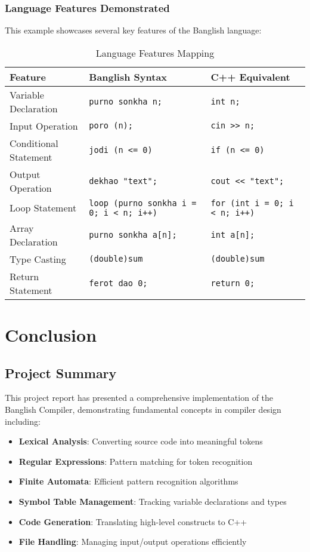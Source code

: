 \documentclass[12pt,a4paper]{article}
\begin{document}
\subsubsection{Language Features Demonstrated}

This example showcases several key features of the Banglish language:

\begin{table}[H]
\centering
\begin{tabular}{|l|l|l|}
\hline
\textbf{Feature} & \textbf{Banglish Syntax} & \textbf{C++ Equivalent} \\
\hline
Variable Declaration & \texttt{purno sonkha n;} & \texttt{int n;} \\
Input Operation & \texttt{poro (n);} & \texttt{cin >> n;} \\
Conditional Statement & \texttt{jodi (n <= 0)} & \texttt{if (n <= 0)} \\
Output Operation & \texttt{dekhao "text";} & \texttt{cout << "text";} \\
Loop Statement & \texttt{loop (purno sonkha i = 0; i < n; i++)} & \texttt{for (int i = 0; i < n; i++)} \\
Array Declaration & \texttt{purno sonkha a[n];} & \texttt{int a[n];} \\
Type Casting & \texttt{(double)sum} & \texttt{(double)sum} \\
Return Statement & \texttt{ferot dao 0;} & \texttt{return 0;} \\
\hline
\end{tabular}
\caption{Language Features Mapping}
\end{table}

\section{Conclusion}

\subsection{Project Summary}

This project report has presented a comprehensive implementation of the Banglish Compiler, demonstrating fundamental concepts in compiler design including:

\begin{itemize}
    \item \textbf{Lexical Analysis}: Converting source code into meaningful tokens
    \item \textbf{Regular Expressions}: Pattern matching for token recognition
    \item \textbf{Finite Automata}: Efficient pattern recognition algorithms
    \item \textbf{Symbol Table Management}: Tracking variable declarations and types
    \item \textbf{Code Generation}: Translating high-level constructs to C++
    \item \textbf{File Handling}: Managing input/output operations efficiently
\end{itemize}
\end{document}
